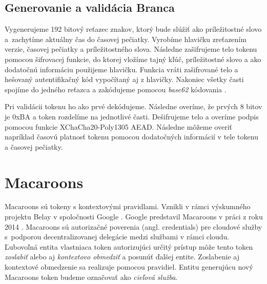 \subsection{Generovanie a validácia Branca}

Vygenerujeme 192 bitový reťazec znakov, ktorý bude slúžiť ako príležitostné slovo a~zachytíme aktuálny čas do časovej pečiatky. Vyrobíme hlavičku zreťazením verzie, časovej pečiatky a príležitostného slova. Následne zašifrujeme telo tokenu pomocou šifrovacej funkcie, do ktorej vložíme tajný kľúč, príležitostné slovo a ako dodatočnú informáciu použijeme hlavičku. Funkcia vráti zašifrované telo a hešovaný autentifikačný kód vypočítaný aj z hlavičky. Nakoniec všetky časti spojíme do jedného reťazca a zakódujeme pomocou \textit{base62} kódovania \cite{base62}.

Pri validácii tokenu ho ako prvé dekódujeme. Následne overíme, že prvých 8 bitov je 0xBA a token rozdelíme na jednotlivé časti. Dešifrujeme telo a overíme podpis pomocou funkcie XChaCha20-Poly1305 AEAD. Následne môžeme overiť napríklad časovú platnosť tokenu pomocou dodatočných informácií v tele tokenu a časovej pečiatky.

\section{Macaroons}

Macaroons sú tokeny s kontextovými pravidlami. Vznikli v rámci výskumného projektu Belay v spoločnosti Google \cite{belay}. Google predstavil Macaroons v práci z roku 2014 \cite{macaroons_paper}. Macaroons sú autorizačné poverenia (angl. credentials) pre cloudové služby s~podporou decentralizovanej delegácie medzi službami v rámci cloudu. Ľubovoľná entita vlastniaca token autorizujúci určitý prístup môže tento token \textit{zoslabiť} alebo aj \textit{kontextovo obmedziť} a posunúť ďalšej entite. Zoslabenie aj kontextové obmedzenie sa realizuje pomocou pravidiel. Entitu generujúcu nový Macaroons token budeme označovať ako \textit{cieľová služba}.

